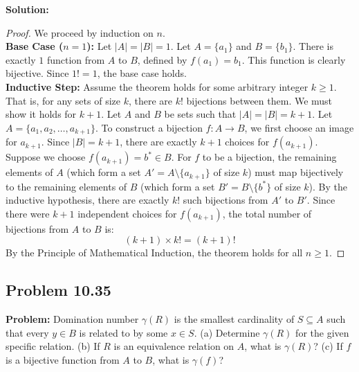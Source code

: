 \documentclass[11pt, a4paper]{article}
\theoremstyle{definition}
\theoremstyle{remark}
\begin{document}
\textbf{Solution:}
\begin{proof}
We proceed by induction on $n$. \\
\textbf{Base Case ($n=1$):} Let $|A| = |B| = 1$. Let $A = \{a_1\}$ and $B = \{b_1\}$. There is exactly $1$ function from $A$ to $B$, defined by $f(a_1) = b_1$. This function is clearly bijective. Since $1! = 1$, the base case holds. \\
\textbf{Inductive Step:} Assume the theorem holds for some arbitrary integer $k \ge 1$. That is, for any sets of size $k$, there are $k!$ bijections between them. 
We must show it holds for $k+1$. Let $A$ and $B$ be sets such that $|A| = |B| = k+1$. 
Let $A = \{a_1, a_2, \dots, a_{k+1}\}$. 
To construct a bijection $f: A \to B$, we first choose an image for $a_{k+1}$. Since $|B| = k+1$, there are exactly $k+1$ choices for $f(a_{k+1})$. 
Suppose we choose $f(a_{k+1}) = b^* \in B$. For $f$ to be a bijection, the remaining elements of $A$ (which form a set $A' = A \setminus \{a_{k+1}\}$ of size $k$) must map bijectively to the remaining elements of $B$ (which form a set $B' = B \setminus \{b^*\}$ of size $k$). 
By the inductive hypothesis, there are exactly $k!$ such bijections from $A'$ to $B'$. 
Since there were $k+1$ independent choices for $f(a_{k+1})$, the total number of bijections from $A$ to $B$ is:
\[ (k+1) \times k! = (k+1)! \]
By the Principle of Mathematical Induction, the theorem holds for all $n \ge 1$.
\end{proof}

\subsection{Problem 10.35}
\textbf{Problem:} Domination number $\gamma(R)$ is the smallest cardinality of $S \subseteq A$ such that every $y \in B$ is related to by some $x \in S$.
(a) Determine $\gamma(R)$ for the given specific relation.
(b) If $R$ is an equivalence relation on $A$, what is $\gamma(R)$?
(c) If $f$ is a bijective function from $A$ to $B$, what is $\gamma(f)$?
\end{document}
